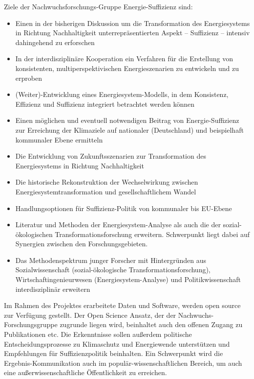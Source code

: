 \documentclass[a4paper,11pt,twoside]{scrartcl}
\begin{document}
Ziele der Nachwuchsforschungs-Gruppe Energie-Suffizienz sind:
\begin{itemize}
 \item Einen in der bisherigen Diskussion um die Transformation des Energiesystems in Richtung Nachhaltigkeit unterrepräsentierten Aspekt  -- Suffizienz -- intensiv dahingehend zu erforschen
  \item In der interdisziplinäre Kooperation ein Verfahren für die Erstellung von konsistenten, multiperspektivischen  Energieszenarien zu entwickeln und zu erproben
  \item (Weiter)-Entwicklung eines Energiesystem-Modells, in dem Konsistenz, Effizienz und Suffizienz integriert betrachtet werden können
 \item Einen möglichen und eventuell notwendigen Beitrag von Energie-Suffizienz zur Erreichung der Klimaziele auf nationaler (Deutschland) und beispielhaft kommunaler Ebene ermitteln
 \item Die Entwicklung von Zukunftsszenarien zur Transformation des Energiesystems in Richtung Nachhaltigkeit 
 \item Die historische Rekonstruktion der Wechselwirkung zwischen Energiesystemtransformation und gesellschaftlichem Wandel  
 \item Handlungsoptionen für Suffizienz-Politik von kommunaler bis EU-Ebene
 \item Literatur und Methoden der Energiesystem-Analyse als auch die der sozial-ökologischen Transformationsforschung erweitern. Schwerpunkt liegt dabei auf Synergien zwischen den Forschungsgebieten.
 \item Das Methodenspektrum junger Forscher mit Hintergründen aus Sozialwissenschaft (sozial-ökologische Transformationsforschung), Wirtschaftingenieurwesen (Energiesystem-Analyse) und Politikwissenschaft interdisziplinär erweitern
\end{itemize}

Im Rahmen des Projektes erarbeitete Daten und Software, werden open source zur Verfügung gestellt. Der Open Science Ansatz, der der Nachwuchs-Forschungsgruppe zugrunde liegen wird, beinhaltet auch den offenen Zugang zu Publikationen etc. Die Erkenntnisse sollen außerdem politische Entscheidungsprozesse zu Klimaschutz und Energiewende unterstützen und Empfehlungen für Suffizienzpolitik beinhalten. Ein Schwerpunkt wird die Ergebnis-Kommunikation auch im populär-wissenschaftlichen Bereich, um auch eine außerwissenschaftliche Öffentlichkeit zu erreichen.
\end{document}
